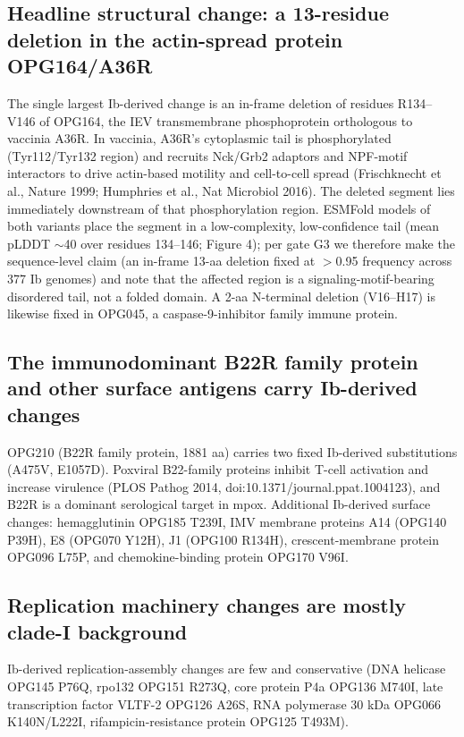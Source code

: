 \documentclass[11pt]{article}
\begin{document}
\subsection{Headline structural change: a 13-residue deletion in the actin-spread protein OPG164/A36R}
The single largest Ib-derived change is an in-frame deletion of residues R134--V146 of OPG164, the
IEV transmembrane phosphoprotein orthologous to vaccinia A36R. In vaccinia, A36R's cytoplasmic tail
is phosphorylated (Tyr112/Tyr132 region) and recruits Nck/Grb2 adaptors and NPF-motif interactors to
drive actin-based motility and cell-to-cell spread (Frischknecht et al., Nature 1999; Humphries et
al., Nat Microbiol 2016). The deleted segment lies immediately downstream of that phosphorylation
region. ESMFold models of both variants place the segment in a low-complexity, low-confidence tail
(mean pLDDT $\sim$40 over residues 134--146; Figure 4); per gate G3 we therefore make the
sequence-level claim (an in-frame 13-aa deletion fixed at $>$0.95 frequency across 377 Ib genomes)
and note that the affected region is a signaling-motif-bearing disordered tail, not a folded domain.
A 2-aa N-terminal deletion (V16--H17) is likewise fixed in OPG045, a caspase-9-inhibitor family
immune protein.

\subsection{The immunodominant B22R family protein and other surface antigens carry Ib-derived changes}
OPG210 (B22R family protein, 1881 aa) carries two fixed Ib-derived substitutions (A475V, E1057D).
Poxviral B22-family proteins inhibit T-cell activation and increase virulence (PLOS Pathog 2014,
doi:10.1371/journal.ppat.1004123), and B22R is a dominant serological target in mpox. Additional
Ib-derived surface changes: hemagglutinin OPG185 T239I, IMV membrane proteins A14 (OPG140 P39H),
E8 (OPG070 Y12H), J1 (OPG100 R134H), crescent-membrane protein OPG096 L75P, and chemokine-binding
protein OPG170 V96I.

\subsection{Replication machinery changes are mostly clade-I background}
Ib-derived replication-assembly changes are few and conservative (DNA helicase OPG145 P76Q, rpo132
OPG151 R273Q, core protein P4a OPG136 M740I, late transcription factor VLTF-2 OPG126 A26S, RNA
polymerase 30 kDa OPG066 K140N/L222I, rifampicin-resistance protein OPG125 T493M).
\end{document}
